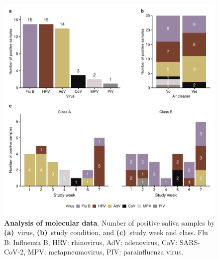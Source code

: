 \documentclass[fleqn,11pt]{wlscirep}
\begin{document}
\begin{figure}[!htpb]
    \centering
    \includegraphics{../../results/mol-data/descriptives.pdf}
    \caption{\textbf{Analysis of molecular data}. Number of positive saliva samples by \textbf{(a)}~virus, \textbf{(b)}~study condition, and \textbf{(c)}~study week and class. Flu B: Influenza B, HRV: rhinovirus, AdV: adenovirus, CoV: SARS-CoV-2, MPV: metapneumovirus, PIV: parainfluenza virus.}
    \label{fig:molecular-descriptives}
\end{figure}
\end{document}

